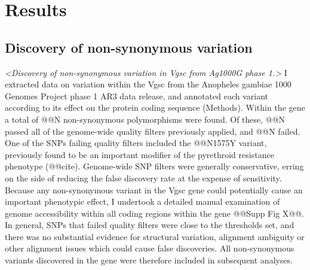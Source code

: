 \documentclass[a4paper,11pt,abstracton,hidelinks]{scrartcl}
\begin{document}
\section*{Results}


\subsection*{Discovery of non-synonymous variation}


\textit{<Discovery of non-synonymous variation in Vgsc from Ag1000G phase 1.>}
%
I extracted data on variation within the Vgsc from the Anopheles gambiae 1000 Genomes Project phase 1 AR3 data release, and annotated each variant according to its effect on the protein coding sequence (Methods).
%
Within the gene a total of @@N non-synonymous polymorphisms were found.
%
Of these, @@N passed all of the genome-wide quality filters previously applied, and @@N failed.
%
One of the SNPs failing quality filters included the @@N1575Y variant, previously found to be an important modifier of the pyrethroid resistance phenotype (@@cite).
%
Genome-wide SNP filters were generally conservative, erring on the side of reducing the false discovery rate at the expense of sensitivity.
%
Because any non-synonymous variant in the Vgsc gene could potentially cause an important phenotypic effect, I undertook a detailed manual examination of genome accessibility within all coding regions within the gene @@Supp Fig X@@.
%
In general, SNPs that failed quality filters were close to the thresholds set, and there was no substantial evidence for structural variation, alignment ambiguity or other alignment issues which could cause false discoveries.
%
All non-synonymous variants discovered in the gene were therefore included in subsequent analyses.
\end{document}
